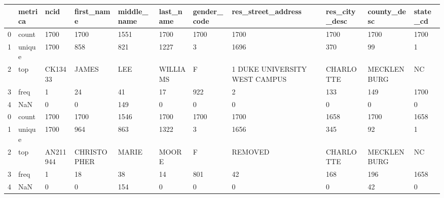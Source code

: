 \begin{tabular}{lllllllllll}
\toprule
{} & metrica &      ncid &   first\_name & middle\_name & last\_name & gender\_code &                  res\_street\_address & res\_city\_desc &  county\_desc & state\_cd \\
\midrule
0 &   count &      1700 &         1700 &        1551 &      1700 &        1700 &                                1700 &          1700 &         1700 &     1700 \\
1 &  unique &      1700 &          858 &         821 &      1227 &           3 &                                1696 &           370 &           99 &        1 \\
2 &     top &   CK13433 &        JAMES &         LEE &  WILLIAMS &           F &  1  DUKE UNIVERSITY WEST CAMPUS     &     CHARLOTTE &  MECKLENBURG &       NC \\
3 &    freq &         1 &           24 &          41 &        17 &         922 &                                   2 &           133 &          149 &     1700 \\
4 &     NaN &         0 &            0 &         149 &         0 &           0 &                                   0 &             0 &            0 &        0 \\
0 &   count &      1700 &         1700 &        1546 &      1700 &        1700 &                                1700 &          1658 &         1700 &     1658 \\
1 &  unique &      1700 &          964 &         863 &      1322 &           3 &                                1656 &           345 &           92 &        1 \\
2 &     top &  AN211944 &  CHRISTOPHER &       MARIE &     MOORE &           F &                             REMOVED &     CHARLOTTE &  MECKLENBURG &       NC \\
3 &    freq &         1 &           18 &          38 &        14 &         801 &                                  42 &           168 &          196 &     1658 \\
4 &     NaN &         0 &            0 &         154 &         0 &           0 &                                   0 &             0 &           42 &        0 \\
\bottomrule
\end{tabular}

